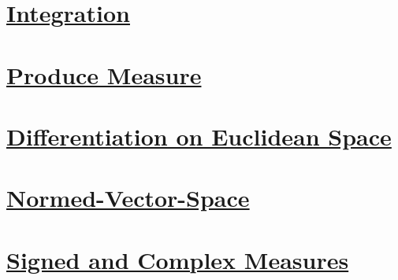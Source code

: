 \section{\hyperref[ch:Integration]{Integration}}

\section{\hyperref[ch:Product-Measure]{Produce Measure}}

\section{\hyperref[ch:Differentiation-on-Euclidean-Space]{Differentiation on Euclidean Space}}

\section{\hyperref[ch:Normed-Vector-Space]{Normed-Vector-Space}}

\section{\hyperref[ch:Signed-and-Complex-Measures]{Signed and Complex Measures}}

